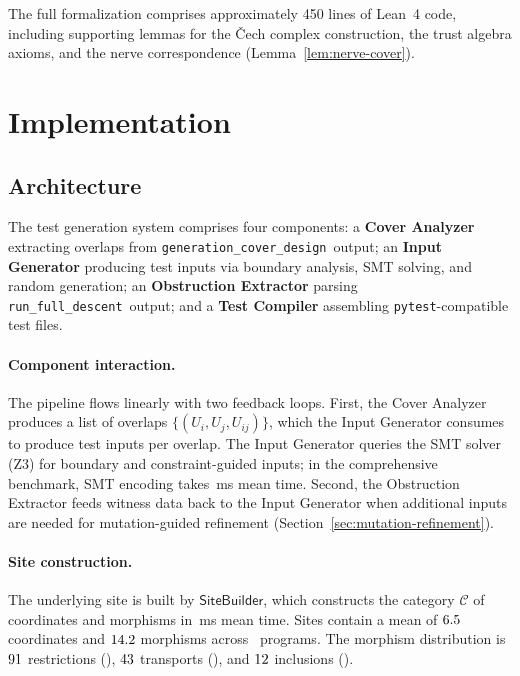\documentclass[11pt]{article}
\newcommand{\GenCoverDesign}{\texttt{generation\_cover\_design}}
\newcommand{\RunDescent}{\texttt{run\_full\_descent}}
\begin{document}
The full formalization comprises approximately 450 lines of Lean~4 code,
including supporting lemmas for the \v{C}ech complex construction, the
trust algebra axioms, and the nerve correspondence
(Lemma~\ref{lem:nerve-cover}).

\section{Implementation}\label{sec:implementation}

\subsection{Architecture}
The test generation system comprises four components: a \textbf{Cover
Analyzer} extracting overlaps from \GenCoverDesign\ output; an \textbf{Input
Generator} producing test inputs via boundary analysis, SMT solving, and
random generation; an \textbf{Obstruction Extractor} parsing \RunDescent\
output; and a \textbf{Test Compiler} assembling \texttt{pytest}-compatible
test files.

\paragraph{Component interaction.}
The pipeline flows linearly with two feedback loops.  First, the Cover
Analyzer produces a list of overlaps $\{(U_i, U_j, U_{ij})\}$, which the
Input Generator consumes to produce test inputs per overlap.  The Input
Generator queries the SMT solver (Z3) for boundary and constraint-guided
inputs; in the comprehensive benchmark, SMT encoding takes
\compProfEncodeForSolverMeanMs\,ms mean time.  Second, the Obstruction
Extractor feeds witness data back to the Input Generator when additional
inputs are needed for mutation-guided refinement
(Section~\ref{sec:mutation-refinement}).

\paragraph{Site construction.}
The underlying site is built by $\mathsf{SiteBuilder}$, which constructs
the category $\mathcal{C}$ of coordinates and morphisms in
\compSiteMeanBuildMs\,ms mean time.  Sites contain a mean of
$6.5$ coordinates and $14.2$ morphisms
across \compSiteTotalBuilt\ programs.  The morphism distribution is
$91$ restrictions (\compMorphRestrictionPct),
$43$ transports (\compMorphTransportPct), and
$12$ inclusions (\compMorphInclusionPct).
\end{document}
